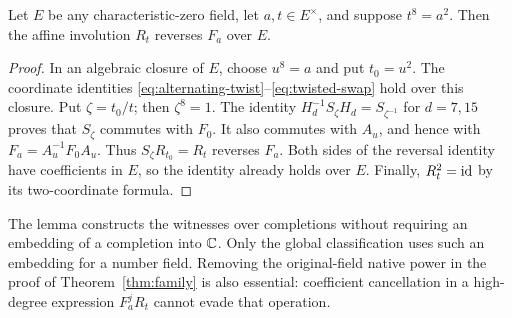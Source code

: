 \begin{lemma}\label{lem:local-construction}
Let $E$ be any characteristic-zero field, let $a,t\in E^\times$,
and suppose $t^8=a^2$. Then the affine involution $R_t$ reverses
$F_a$ over $E$.
\end{lemma}

\begin{proof}
In an algebraic closure of $E$, choose $u^8=a$ and put $t_0=u^2$.
The coordinate identities
\eqref{eq:alternating-twist}--\eqref{eq:twisted-swap} hold over
this closure. Put $\zeta=t_0/t$; then $\zeta^8=1$.
The identity $H_d^{-1}S_\zeta H_d=S_{\zeta^{-1}}$ for
$d=7,15$ proves that $S_\zeta$ commutes with $F_0$.
It also commutes with $A_u$, and hence with $F_a=A_u^{-1}F_0A_u$.
Thus $S_\zeta R_{t_0}=R_t$ reverses $F_a$.
Both sides of the reversal identity have coefficients in $E$,
so the identity already holds over $E$.
Finally, $R_t^2=\mathrm{id}$ by its two-coordinate formula.
\end{proof}

The lemma constructs the witnesses over completions without requiring
an embedding of a completion into $\mathbb C$.
Only the global classification uses such an embedding for a number
field. Removing the original-field native power in the proof of
Theorem~\ref{thm:family} is also essential: coefficient cancellation
in a high-degree expression $F_a^jR_t$ cannot evade that operation.

